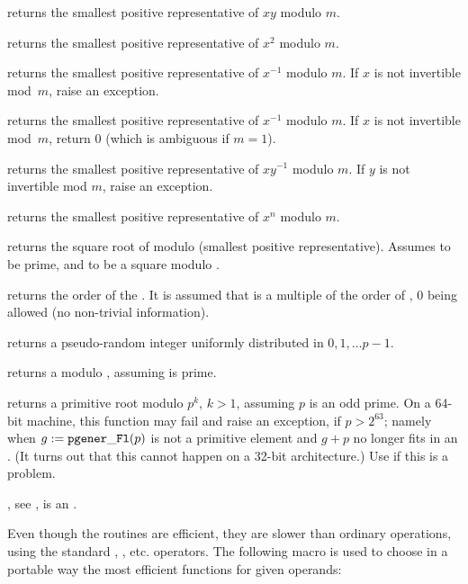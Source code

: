  returns the smallest positive
representative of $x y$ modulo $m$.

 returns the smallest positive
representative of $x^2$ modulo $m$.

 returns the smallest
positive representative of $x^{-1}$ modulo $m$. If $x$ is not invertible
mod~$m$, raise an exception.

 returns the smallest
positive representative of $x^{-1}$ modulo $m$. If $x$ is not invertible
mod~$m$, return $0$ (which is ambiguous if $m=1$).

 returns the smallest
positive representative of $x y^{-1}$ modulo $m$. If $y$ is not invertible
mod $m$, raise an exception.

 returns the smallest
positive representative of $x^n$ modulo $m$.

 returns the square root of 
modulo  (smallest positive representative). Assumes  to be
prime, and  to be a square modulo .

 returns the order of the
 . It is assumed that  is a multiple of the order of
, $0$ being allowed (no non-trivial information).

 returns a pseudo-random integer uniformly
distributed in $0, 1, \dots p-1$.

 returns a  modulo ,
assuming  is prime.

 returns a primitive root modulo $p^k$, $k
> 1$, assuming $p$ is an odd prime. On a 64-bit machine,
this function may fail and raise an exception, if $p > 2^{63}$; namely
when $g := {\tt pgener\_Fl}(p)$ is not a primitive element and $g + p$ no
longer fits in an . (It turns out that this cannot happen on a
32-bit architecture.) Use  if this is a problem.

, see ,
 is an .


Even though the  routines are efficient, they are slower than
ordinary  operations, using the standard \kbd{+}, \kbd{\%}, etc.
operators.
The following macro is used to choose in a portable way the most efficient
functions for given operands:

